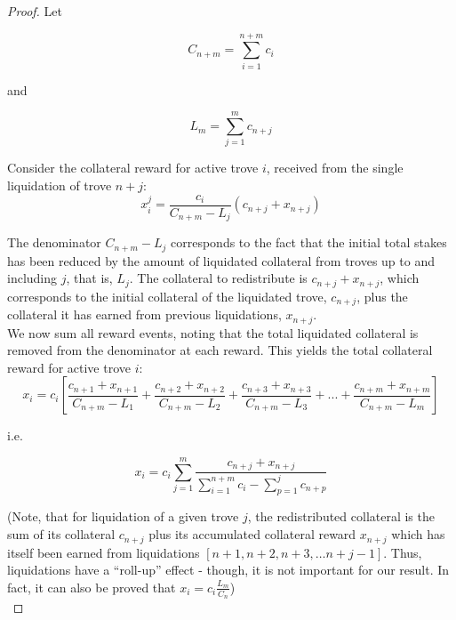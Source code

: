 \documentclass[reqno]{article}
\begin{document}
\begin{proof}
Let

\begin{equation} 
    C_{n+m}=\sum\limits^{n+m}_{i=1}c_i
\end{equation}

\bigskip
and

\begin{equation} 
    L_m=\sum\limits^m_{j=1}c_{n+j}
\end{equation}

\bigskip
Consider the collateral reward for active trove $i$, received from the single liquidation of trove $n + j$: 
 \\

\begin{equation} 
  x_i^j = \frac{c_i}{C_{n+m}-L_j}(c_{n+j}+x_{n+j})
\end{equation}

The denominator $C_{n+m}-L_j$ corresponds to the fact that the initial total stakes has been reduced by the amount of liquidated collateral from  troves up to and including $j$, that is, $L_j$. The collateral to redistribute is $c_{n+j}+x_{n+j}$, which corresponds to the initial collateral of the liquidated trove, $c_{n+j}$, plus the collateral it has earned from previous liquidations, $x_{n+j}$. \\

We now sum all reward events, noting that the total liquidated collateral is removed from the denominator at each reward. This yields the total collateral reward for active trove $i$:\\

\begin{equation} 
    x_i=c_i\left[\frac{c_{n+1}+x_{n+1}}{C_{n+m}-L_1}+\frac{c_{n+2}+x_{n+2}}{C_{n+m}-L_2}+\frac{c_{n+3}+x_{n+3}}{C_{n+m}-L_3}+...+\frac{c_{n+m}+x_{n+m}}{C_{n+m}-L_m}\right]
\end{equation}

\bigskip
i.e.

\begin{equation} 
    x_i=c_i\sum\limits^m_{j=1}\frac{c_{n+j}+x_{n+j}}{\sum\limits^{n+m}_{i=1}c_i-\sum\limits^j_{p=1}c_{n+p}}
\end{equation}

\bigskip
(Note, that for liquidation of a given trove $j$, the redistributed collateral is the sum of its collateral $c_{n+j}$ plus its accumulated collateral reward $x_{n+j}$ which has itself been earned from liquidations $[n+1, n+2, n+3, … n+j-1]$.  Thus, liquidations have a “roll-up” effect - though, it is not important for our result. In fact, it can also be proved that $x_i=c_i\frac{L_m}{C_n}$)\\


\end{proof}
\end{document}
